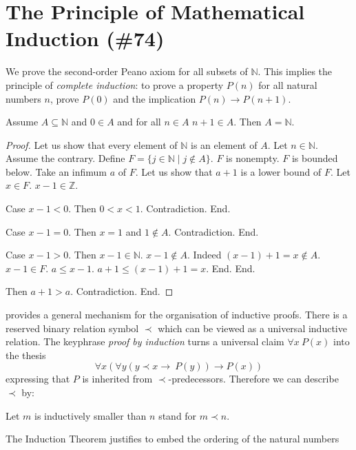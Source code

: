 \documentclass{article}
\begin{document}
\section{The Principle of Mathematical Induction (\#74)}

We prove the second-order Peano axiom for all subsets of $\mathbb{N}$.
This implies the principle of {\em complete induction}: to prove a 
property $P(n)$ for all natural numbers $n$, prove $P(0)$ and
the implication $P(n) \rightarrow P(n+1)$. 
%
\begin{forthel}

\begin{theorem}
Assume $A \subseteq \mathbb{N}$
and $0 \in A$ and for all $n \in A$ $n + 1 \in A$.
Then $A = \mathbb{N}$.
\end{theorem}

\begin{proof}
Let us show that every element of $\mathbb{N}$ is an element of $A$.
	Let $n \in \mathbb{N}$.
	Assume the contrary.
	Define $F = \{  j \in \mathbb{N} \mid j \notin A\}$.
	$F$ is nonempty. $F$ is bounded below.
  Take an infimum $a$ of $F$.
	Let us show that $a+1$ is a lower bound of $F$.
		Let $x \in F$. $x - 1 \in \mathbb{Z}$.

		Case $x - 1 < 0$. Then $0 < x < 1$. Contradiction. End.

		Case $x - 1 = 0$. Then $x = 1$ and $1 \notin A$. Contradiction. End.

		Case $x - 1 > 0$. Then $x - 1 \in \mathbb{N}$.
      $x - 1 \notin A$. Indeed $(x - 1) + 1 = x \notin A$. $x - 1 \in F$.
			$a \leq x - 1$.
			$a + 1 \leq (x - 1) + 1 = x$.
		End.
	End.

	Then $a+1 > a$.
	Contradiction.
End.
\end{proof}
\end{forthel}
%
\Naproche provides a general mechanism for the organisation of
inductive proofs. There is a reserved binary relation
symbol $\prec$ which can be viewed as a universal inductive relation.
The keyphrase {\em proof by induction} turns a universal
claim $\forall x \ P(x)$ into the thesis
$$\forall x (\forall y (y \prec x \rightarrow \ P(y)) \rightarrow P(x))$$
expressing that $P$ is inherited from $\prec$-predecessors.  
Therefore we can describe $\prec$ by:
%
\begin{forthel}
Let $m$ is inductively smaller than $n$ stand for $m \prec n$.
\end{forthel}
%
The Induction Theorem justifies to embed the ordering of the natural numbers
\end{document}
